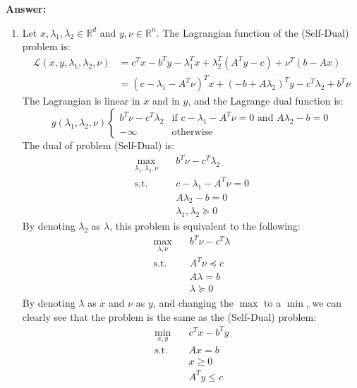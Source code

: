 \documentclass[11pt,a4paper]{article}
\newenvironment{solution}{
  \par\noindent\textbf{Answer:}\vspace{0.3em}
}{\vspace{1em}}
\begin{document}
\begin{solution}
\begin{enumerate}
        \item Let $x, \lambda_1, \lambda_2 \in \mathbb{R}^d$ and $y, \nu \in \mathbb{R}^n$. The Lagrangian function of the (Self-Dual) problem is: $$\begin{aligned}
            \mathcal{L}(x, y, \lambda_1, \lambda_2, \nu) &= c^T x - b^T y - \lambda_1^T x + \lambda_2^T (A^T y - c) + \nu^T (b - Ax)\\
            &= (c - \lambda_1 - A^T \nu)^T x + (-b + A\lambda_2)^T y - c^T \lambda_2 + b^T \nu
        \end{aligned}$$
        The Lagrangian is linear in $x$ and in $y$, and the Lagrange dual function is: $$g(\lambda_1, \lambda_2, \nu) \begin{cases}
            b^T \nu - c^T \lambda_2 &\text{if } c - \lambda_1 - A^T \nu = 0 \text{ and } A\lambda_2 - b = 0\\
            -\infty &\text{otherwise}
        \end{cases}$$
        The dual of problem (Self-Dual) is:$$\begin{aligned}
            \max_{\lambda_1, \lambda_2, \nu} \quad & b^T \nu - c^T \lambda_2\\
            \text{s.t.} \quad & c - \lambda_1 - A^T \nu = 0\\
            & A\lambda_2 - b = 0\\
            & \lambda_1, \lambda_2 \succeq 0
        \end{aligned}$$
        By denoting $\lambda_2$ as $\lambda$, this problem is equivalent to the following:$$\begin{aligned}
            \max_{\lambda, \nu} \quad & b^T \nu - c^T \lambda\\
            \text{s.t.} \quad & A^T \nu \preceq c\\
            & A \lambda = b\\
            & \lambda \succeq 0
        \end{aligned}$$
        By denoting $\lambda$ as $x$ and $\nu$ as $y$, and changing the $\max$ to a $\min$, we can clearly see that the problem is the same as the (Self-Dual) problem:$$\begin{aligned}
            \min_{x,y} \quad & c^{T}x - b^{T}y \\
            \text{s.t.} \quad & Ax = b \\
            & x \ge 0 \\
            & A^{T}y \le c
        \end{aligned}$$
        



\end{enumerate}
\end{solution}
\end{document}
